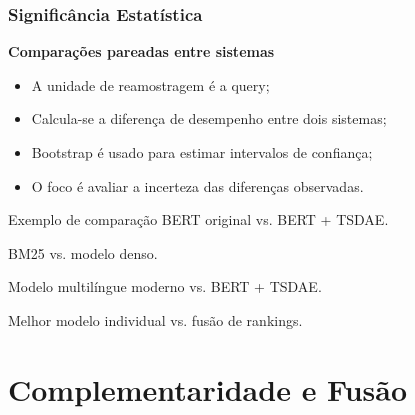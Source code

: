 \documentclass[aspectratio=169]{beamer}
\begin{document}
\begin{frame}
\frametitle{Significância Estatística}

\textbf{Comparações pareadas entre sistemas}

\vspace{0.25cm}

\begin{itemize}
  \item A unidade de reamostragem é a query;
  \item Calcula-se a diferença de desempenho entre dois sistemas;
  \item Bootstrap é usado para estimar intervalos de confiança;
  \item O foco é avaliar a incerteza das diferenças observadas.
\end{itemize}

\vspace{0.3cm}

\begin{alertblock}{Exemplo de comparação}
BERT original vs. BERT + TSDAE.

BM25 vs. modelo denso.

Modelo multilíngue moderno vs. BERT + TSDAE.

Melhor modelo individual vs. fusão de rankings.
\end{alertblock}

\end{frame}

\section{Complementaridade e Fusão}
\end{document}
